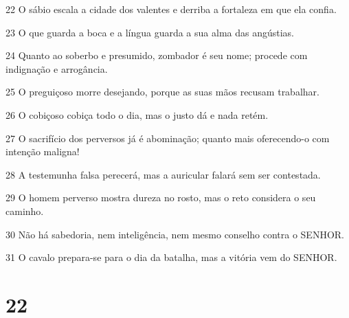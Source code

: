 \par 22 O sábio escala a cidade dos valentes e derriba a fortaleza em que ela confia.
\par 23 O que guarda a boca e a língua guarda a sua alma das angústias.
\par 24 Quanto ao soberbo e presumido, zombador é seu nome; procede com indignação e arrogância.
\par 25 O preguiçoso morre desejando, porque as suas mãos recusam trabalhar.
\par 26 O cobiçoso cobiça todo o dia, mas o justo dá e nada retém.
\par 27 O sacrifício dos perversos já é abominação; quanto mais oferecendo-o com intenção maligna!
\par 28 A testemunha falsa perecerá, mas a auricular falará sem ser contestada.
\par 29 O homem perverso mostra dureza no rosto, mas o reto considera o seu caminho.
\par 30 Não há sabedoria, nem inteligência, nem mesmo conselho contra o SENHOR.
\par 31 O cavalo prepara-se para o dia da batalha, mas a vitória vem do SENHOR.

\chapter{22}

